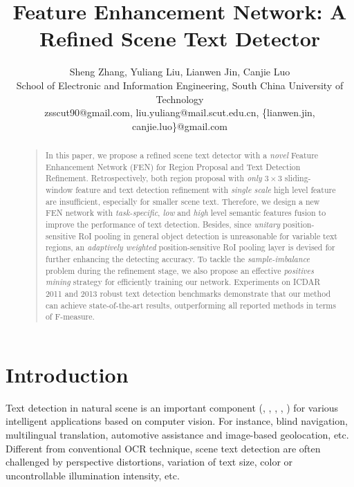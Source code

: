 \documentclass[letterpaper]{article}
\begin{document}
\title{Feature Enhancement Network: A Refined Scene Text Detector}
\author{Sheng Zhang, Yuliang Liu, Lianwen Jin, Canjie Luo\\
School of Electronic and Information Engineering, South China University of Technology\\
zsscut90@gmail.com, liu.yuliang@mail.scut.edu.cn, \{lianwen.jin, canjie.luo\}@gmail.com\\
}
\maketitle
\begin{abstract}
\begin{quote}
In this paper, we propose a refined scene text detector with a \textit{novel} Feature Enhancement Network (FEN) for Region Proposal and Text Detection Refinement. Retrospectively, both region proposal with \textit{only} $3\times 3$ sliding-window feature and text detection refinement with \textit{single scale} high level feature are insufficient, especially for smaller scene text. Therefore, we design a new FEN network with \textit{task-specific}, \textit{low} and \textit{high} level semantic features fusion to improve the performance of text detection. Besides, since \textit{unitary} position-sensitive RoI pooling in general object detection is unreasonable for variable text regions, an \textit{adaptively weighted} position-sensitive RoI pooling layer is devised for further enhancing the detecting accuracy. To tackle the \textit{sample-imbalance} problem during the refinement stage, we also propose an effective \textit{positives mining} strategy for efficiently training our network. Experiments on ICDAR 2011 and 2013 robust text detection benchmarks demonstrate that our method can achieve state-of-the-art results, outperforming all reported methods in terms of F-measure.
\end{quote}
\end{abstract}

\section{Introduction}
Text detection in natural scene is an important component (\cite{bissacco2013photoocr}, \cite{yin2014robust}, \cite{ye2015text}, \cite{He2016Text}, \cite{he2017single}) for various intelligent applications based on computer vision. For instance, blind navigation, multilingual translation, automotive assistance and image-based geolocation, etc. Different from conventional OCR technique, scene text detection are often challenged by perspective distortions, variation of text size, color or uncontrollable illumination intensity, etc.
\end{document}
